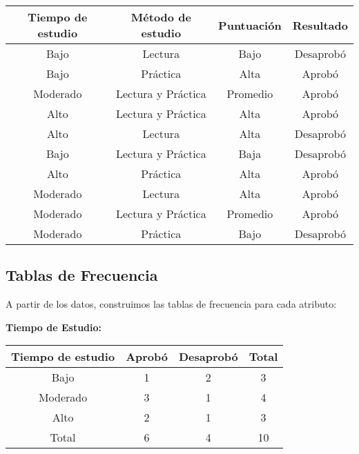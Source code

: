 \documentclass[12pt]{article}
\begin{document}
\begin{table}[H]
    \centering
    \begin{tabular}{cccc}
        \toprule
        Tiempo de estudio & Método de estudio & Puntuación & Resultado \\
        \midrule
        Bajo & Lectura & Bajo & Desaprobó \\
        Bajo & Práctica & Alta & Aprobó \\
        Moderado & Lectura y Práctica & Promedio & Aprobó \\
        Alto & Lectura y Práctica & Alta & Aprobó \\
        Alto & Lectura & Alta & Desaprobó \\
        Bajo & Lectura y Práctica & Baja & Desaprobó \\
        Alto & Práctica & Alta & Aprobó \\
        Moderado & Lectura & Alta & Aprobó \\
        Moderado & Lectura y Práctica & Promedio & Aprobó \\
        Moderado & Práctica & Bajo & Desaprobó \\
        \bottomrule
    \end{tabular}
\end{table}

\subsection{Tablas de Frecuencia}
A partir de los datos, construimos las tablas de frecuencia para cada atributo:

\vspace{1em}

\textbf{Tiempo de Estudio:}
\begin{table}[H]
    \centering
    \begin{tabular}{cccc}
        \toprule
        Tiempo de estudio & Aprobó & Desaprobó & Total \\
        \midrule
        Bajo & 1 & 2 & 3 \\
        Moderado & 3 & 1 & 4 \\
        Alto & 2 & 1 & 3 \\
        \midrule
        Total & 6 & 4 & 10 \\
        \bottomrule
    \end{tabular}
\end{table}

\vspace{1em}
\end{document}
